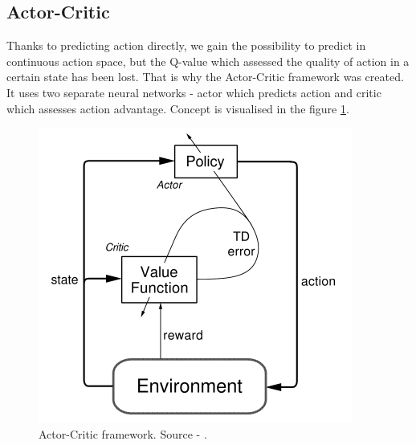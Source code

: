 \subsection{Actor-Critic}
Thanks to predicting action directly, we gain the possibility to predict in continuous action space, but the Q-value which assessed the quality of action in a certain state has been lost. That is why the Actor-Critic framework was created. It uses two separate neural networks - actor which predicts action and critic which assesses action advantage. Concept is visualised in the figure \ref{fig:actorcritic}.
\begin{figure}[H]
\centering
\includegraphics[scale=0.55]{fig/actor-critic.png}
\caption[Actor-Critic framework]{Actor-Critic framework. Source - \cite{sutton2012}.}
\label{fig:actorcritic}
\end{figure}
\clearpage

